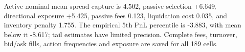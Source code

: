 Active nominal mean spread capture is 4.502, passive selection +6.649, directional exposure +5.425, passive fees 0.123, liquidation cost 0.035, and inventory penalty 1.755. The empirical 5th PnL percentile is -3.883, with mean below it -8.617; tail estimates have limited precision. Complete fees, turnover, bid/ask fills, action frequencies and exposure are saved for all 189 cells.
